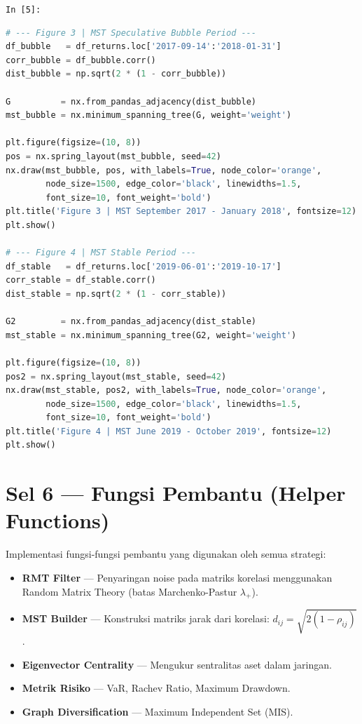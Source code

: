\documentclass[12pt,a4paper]{article}
\newcommand{\cellIn}[1]{%
  \begin{tcolorbox}[cellheader]
    \texttt{In [#1]:}
  \end{tcolorbox}\vspace{-6pt}%
}
\begin{document}
\cellIn{5}
\begin{tcolorbox}[codebox]
\begin{lstlisting}[language=Python, numbers=none]
# --- Figure 3 | MST Speculative Bubble Period ---
df_bubble   = df_returns.loc['2017-09-14':'2018-01-31']
corr_bubble = df_bubble.corr()
dist_bubble = np.sqrt(2 * (1 - corr_bubble))

G          = nx.from_pandas_adjacency(dist_bubble)
mst_bubble = nx.minimum_spanning_tree(G, weight='weight')

plt.figure(figsize=(10, 8))
pos = nx.spring_layout(mst_bubble, seed=42)
nx.draw(mst_bubble, pos, with_labels=True, node_color='orange',
        node_size=1500, edge_color='black', linewidths=1.5,
        font_size=10, font_weight='bold')
plt.title('Figure 3 | MST September 2017 - January 2018', fontsize=12)
plt.show()

# --- Figure 4 | MST Stable Period ---
df_stable   = df_returns.loc['2019-06-01':'2019-10-17']
corr_stable = df_stable.corr()
dist_stable = np.sqrt(2 * (1 - corr_stable))

G2         = nx.from_pandas_adjacency(dist_stable)
mst_stable = nx.minimum_spanning_tree(G2, weight='weight')

plt.figure(figsize=(10, 8))
pos2 = nx.spring_layout(mst_stable, seed=42)
nx.draw(mst_stable, pos2, with_labels=True, node_color='orange',
        node_size=1500, edge_color='black', linewidths=1.5,
        font_size=10, font_weight='bold')
plt.title('Figure 4 | MST June 2019 - October 2019', fontsize=12)
plt.show()
\end{lstlisting}
\end{tcolorbox}

\section{Sel 6 --- Fungsi Pembantu (Helper Functions)}

Implementasi fungsi-fungsi pembantu yang digunakan oleh semua strategi:

\begin{itemize}
  \item \textbf{RMT Filter} --- Penyaringan noise pada matriks korelasi
        menggunakan Random Matrix Theory (batas Marchenko-Pastur $\lambda_+$).
  \item \textbf{MST Builder} --- Konstruksi matriks jarak dari korelasi:
        $d_{ij} = \sqrt{2(1 - \rho_{ij})}$.
  \item \textbf{Eigenvector Centrality} --- Mengukur sentralitas aset dalam
        jaringan.
  \item \textbf{Metrik Risiko} --- VaR, Rachev Ratio, Maximum Drawdown.
  \item \textbf{Graph Diversification} --- Maximum Independent Set (MIS).
\end{itemize}
\end{document}
